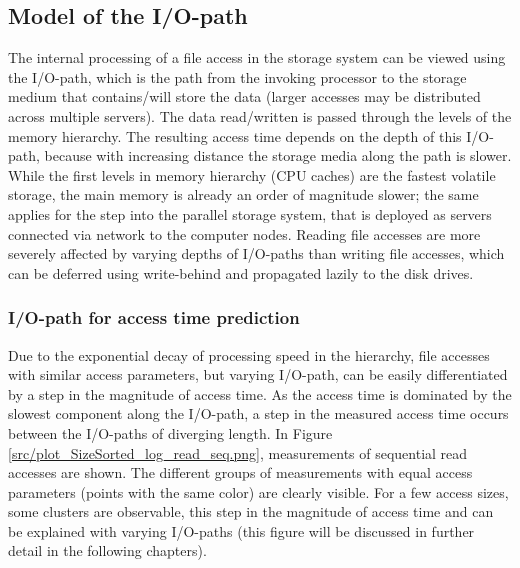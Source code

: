 \documentclass{superfri}
\begin{document}
\subsection{Model of the I/O-path}
The internal processing of a file access in the storage system can be viewed using the I/O-path, which is the path from the invoking processor to the storage medium that contains/will store the data (larger accesses may be distributed across multiple servers). 
The data read/written is passed through the levels of the memory hierarchy.
The resulting access time depends on the depth of this I/O-path, because with increasing distance the storage media along the path is slower.
While the first levels in memory hierarchy (CPU caches) are the fastest volatile storage, the main memory is already an order of magnitude slower; the same applies for the step into the parallel storage system, that is deployed as servers connected via network to the computer nodes.
Reading file accesses are more severely affected by varying depths of I/O-paths than writing file accesses, which can be deferred using write-behind and propagated lazily to the disk drives.

\subsubsection{I/O-path for access time prediction}
\label{sec:path_for_pred}
Due to the exponential decay of processing speed in the hierarchy, file accesses with similar access parameters, but varying I/O-path, can be easily differentiated by a step in the magnitude of access time.
As the access time is dominated by the slowest component along the I/O-path, a step in the measured access time occurs between the  I/O-paths of diverging length.
In Figure\,\ref{src/plot_SizeSorted_log_read_seq.png}, measurements of sequential read accesses are shown.
The different groups of measurements with equal access parameters (points with the same color) are clearly visible.
For a few access sizes, some clusters are observable, this step in the magnitude of access time and can be explained with varying I/O-paths (this figure will be discussed in further detail in the following chapters).
\end{document}
